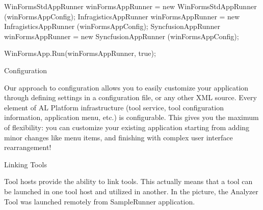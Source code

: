 WinFormsStdAppRunner winFormsAppRunner = new WinFormsStdAppRunner (winFormsAppConfig);
InfragisticsAppRunner winFormsAppRunner = new InfragisticsAppRunner (winFormsAppConfig);
SyncfusionAppRunner winFormsAppRunner = new SyncfusionAppRunner (winFormsAppConfig);


WinFormsApp.Run(winFormsAppRunner, true);

Configuration

Our approach to configuration allows you to easily customize your application through defining settings in a configuration file, or any other XML source. Every element of AL Platform infrastructure (tool service, tool configuration information, application menu, etc.) is configurable. This gives you the maximum of flexibility: you can customize your existing application starting from adding minor changes like menu items, and finishing with complex user interface rearrangement!

Linking Tools 

Tool hosts provide the ability to link tools. This actually means that a tool can be launched in one tool host and utilized in another. In the picture, the Analyzer Tool was launched remotely from SampleRunner application.
